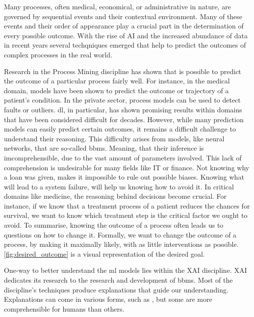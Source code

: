 \documentclass[./../../paper.tex]{subfiles}
\begin{document}
Many processes, often medical, economical, or administrative in nature, are governed by sequential events and their contextual environment. Many of these events and their order of appearance play a crucial part in the determination of every possible outcome. With the rise of AI and the increased abundance of data in recent years several techqniques emerged that help to predict the outcomes of complex processes in the real world. 

Research in the Process Mining discipline has shown that is possible to predict the outcome of a particular process fairly well\needscite. For instance, in the medical domain, models have been shown to predict the outcome or trajectory of a patient's condition\needscite. In the private sector, process models can be used to detect faults or outliers. \gls{dl}, in particular, has shown promising results within domains that have been considered difficult for decades. However, while many prediction models can easily predict certain outcomes, it remains a difficult challenge to understand their reasoning. This difficulty arises from models, like neural networks, that are so-called \glspl{bbm}. Meaning, that their inference is imcomprehensible, due to the vast amount of parameters involved. This lack of comprehension is undesirable for many fields like IT or finance. Not knowing why a loan was given, makes it impossible to rule out possible biases. Knowing what will lead to a system failure, will help us knowing how to avoid it. In critical domains like medicine, the reasoning behind decisions become crucial. For instance, if we know that a treatment process of a patient reduces the chances for survival, we want to know which treatment step is the critical factor we ought to avoid. To summarise, knowing the outcome of a process often leads us to questions on how to change it. Formally, we want to change the outcome of a process, by making it maximally likely, with as little interventions as possible\needscite. \autoref{fig:desired_outcome} is a visual representation of the desired goal.


One-way to better understand the \gls{ml} models lies within the \gls{XAI} discipline. \gls{XAI} dedicates its research to the research and development of \glspl{bbm}. Most of the discipline's techniques produce explanations that guide our understanding. Explanations can come in various forms, such as \needscite, but some are more comprehensible for humans than others. 
\end{document}

